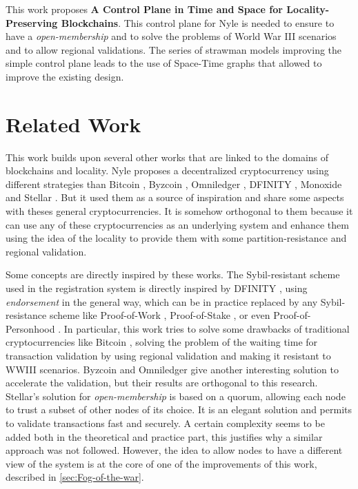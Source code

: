 \documentclass[a4paper,11pt,oneside]{report}
\begin{document}

This work proposes \textbf{A Control Plane in Time and Space for
Locality-Preserving Blockchains}. This control plane for Nyle is needed to
ensure to have a \textit{open-membership} and to solve the problems of World
War III scenarios and to allow regional validations. The series of strawman
models improving the simple control plane leads to the use of Space-Time graphs
that allowed to improve the existing design. 



\chapter{Related Work} \label{chap:RelatedWork} %

This work builds upon several other works that are linked to the domains of
blockchains and locality. Nyle proposes a decentralized cryptocurrency using
different strategies than Bitcoin \cite{Nakamoto2009}, Byzcoin
\cite{Kogias2016}, Omniledger \cite{Kokoris-Kogias2017}, DFINITY
\cite{Hanke2018}, Monoxide \cite{Wang2019} and Stellar \cite{Lokhava2019}. But
it used them as a source of inspiration and share some aspects with theses
general cryptocurrencies. It is somehow orthogonal to them because it can use
any of these cryptocurrencies as an underlying system and enhance them using
the idea of the locality to provide them with some partition-resistance and
regional validation. 

Some concepts are directly inspired by these works. The Sybil-resistant scheme
used in the registration system is directly inspired by DFINITY
\cite{Hanke2018}, using \textit{endorsement} in the general way, which can be
in practice replaced by any Sybil-resistance scheme like Proof-of-Work
\cite{Nakamoto2009}, Proof-of-Stake \cite{wood2014ethereum}, or even
Proof-of-Personhood \cite{Borge2017}. In particular, this work tries to solve
some drawbacks of traditional cryptocurrencies like Bitcoin
\cite{Nakamoto2009}, solving the problem of the waiting time for transaction
validation by using regional validation and making it resistant to WWIII
scenarios. Byzcoin \cite{Kogias2016} and Omniledger \cite{Kokoris-Kogias2017}
give another interesting solution to accelerate the validation, but their
results are orthogonal to this research. Stellar's solution for
\textit{open-membership} \cite{Lokhava2019} is based on a quorum, allowing each
node to trust a subset of other nodes of its choice. It is an elegant solution
and permits to validate transactions fast and securely. A certain complexity
seems to be added both in the theoretical and practice part, this justifies why
a similar approach was not followed. However, the idea to allow nodes to have a
different view of the system is at the core of one of the improvements of this
work, described in \autoref{sec:Fog-of-the-war}.
\end{document}
